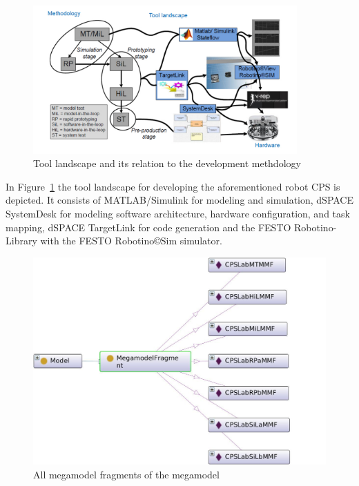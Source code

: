\begin{figure}[!htb]
\centering
\includegraphics[width=0.9\textwidth]{figures/mm-hpi2.pdf}
\caption{Tool landscape and its relation to the development methdology}
\label{fig:MMFig2}
\end{figure}

In Figure~\ref{fig:MMFig2} the tool landscape for developing the aforementioned robot CPS is depicted. It consists of
%
MATLAB/Simulink for modeling and simulation,
%
dSPACE SystemDesk for modeling software architecture, hardware configuration, and task mapping,
%
dSPACE TargetLink for code generation and
%
the FESTO Robotino-Library with the FESTO Robotino{\copyright}Sim simulator.

\begin{figure}[!htb]
\centering
\includegraphics[scale=0.4]{figures/CPSLabMTMMF-NEW.jpeg}
\caption{All megamodel fragments of the \CPSLabMM megamodel}
\label{fig:MegaModelFragmentsForCPSLabMM}
\end{figure}
 
